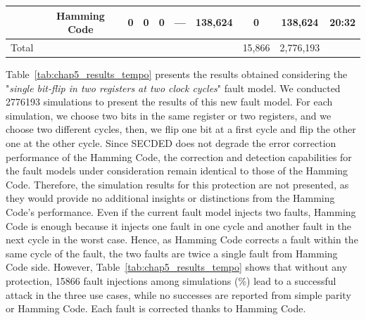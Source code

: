 \begin{table}[t]
\begin{tabular}{@{}cccccccccc@{}}
                                                          & Hamming Code  & 0     & 0       & 0      & —         & 138,624                                  & 0               & 138,624   & 20:32                           \\\midrule
        Total                                             &               &       &         &        &           &                                          & 15,866          & 2,776,193 &                                 \\
        \bottomrule
    \end{tabular}
\end{table}

Table~\ref{tab:chap5_results_tempo} presents the results obtained considering the "\textit{single bit-flip in two registers at two clock cycles}" fault model. We conducted \num{2776193} simulations to present the results of this new fault model. For each simulation, we choose two bits in the same register or two registers, and we choose two different cycles, then, we flip one bit at a first cycle and flip the other one at the other cycle. Since SECDED does not degrade the error correction performance of the Hamming Code, the correction and detection capabilities for the fault models under consideration remain identical to those of the Hamming Code. Therefore, the simulation results for this protection are not presented, as they would provide no additional insights or distinctions from the Hamming Code's performance.
Even if the current fault model injects two faults, Hamming Code is enough because it injects one fault in one cycle and another fault in the next cycle in the worst case. Hence, as Hamming Code corrects a fault within the same cycle of the fault, the two faults are twice a single fault from Hamming Code side.
However, Table~\ref{tab:chap5_results_tempo} shows that without any protection, \num{15866} fault injections among  simulations (\%) lead to a successful attack in the three use cases, while no successes are reported from simple parity or Hamming Code. Each fault is corrected thanks to Hamming Code.


